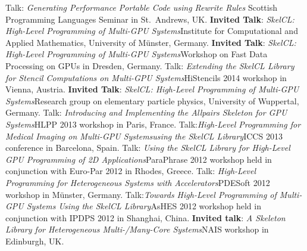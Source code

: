 \documentclass[11pt,a4paper]{moderncv}
\begin{document}
         {Talk: \emph{Generating Performance Portable Code using Rewrite Rules}\newline
         \small Scottish Programming Languages Seminar in St.\ Andrews, UK.}
         {\textbf{Invited Talk}: \emph{SkelCL\@: High-Level Programming of Multi-GPU
          Systems}\newline \small Institute for Computational and Applied
          Mathematics, University of Münster, Germany.}
         {\textbf{Invited Talk}: \emph{SkelCL\@: High-Level Programming of Multi-GPU
          Systems}\newline \small Workshop on Fast Data Processing on GPUs in
          Dresden, Germany.}
         {Talk: \emph{Extending the SkelCL Library for Stencil
          Computations on Multi-GPU Systems}\newline \small HiStencils 2014
          workshop in Vienna, Austria.}
         {\textbf{Invited Talk}: \emph{SkelCL\@: High-Level Programming of Multi-GPU
          Systems}\newline \small Research group on elementary particle physics,
          University of Wuppertal, Germany.}
         {Talk: \emph{Introducing and Implementing the Allpairs Skeleton for GPU
          Systems}\newline \small HLPP 2013 workshop in Paris, France.}
         {Talk:\emph{High-Level Programming for Medical Imaging on Multi-GPU
          Systems\newline using the SkelCL Library}\newline \small ICCS 2013 conference in
          Barcelona, Spain.}
       {Talk: \emph{Using the SkelCL Library for High-Level GPU Programming of
        2D Applications}\newline \small ParaPhrase 2012 workshop held in
        conjunction with Euro-Par 2012 in Rhodes, Greece.}
       {Talk: \emph{High-Level Programming for Heterogeneous Systems with
        Accelerators}\newline \small PDESoft 2012 workshop in Münster, Germany.}
       {Talk:\emph{Towards High-Level Programming of Multi-GPU Systems Using
        the SkelCL Library}\newline \small AsHES 2012 workshop held in
        conjunction with IPDPS 2012 in Shanghai, China.}
       {\textbf{Invited talk}: \emph{A Skeleton Library for Heterogeneous
        Multi-/Many-Core Systems}\newline \small NAIS workshop in Edinburgh, UK.}
\end{document}
